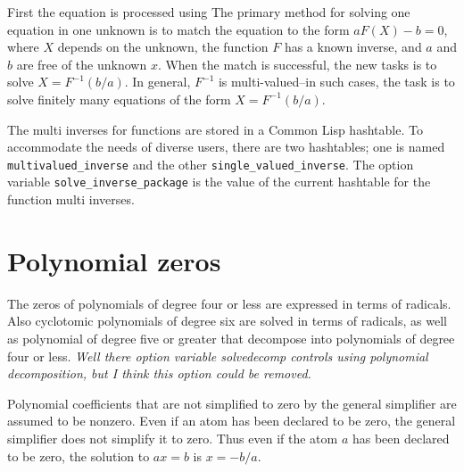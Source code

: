 \documentclass[]{article}%
\newcommand{\multivaluedinverse}{\texttt{multivalued\_inverse}}
\newcommand{\singlevaluedinverse}{\texttt{single\_valued\_inverse}}
\newcommand{\solveinversepackage}{\texttt{solve\_inverse\_package}}
\begin{document}
First the equation is processed using
The primary method for solving one equation in one unknown is to match the equation to the form \(a F(X) - b = 0\), where \(X\) depends on the unknown, the function \(F\) has a known inverse, and \(a\) and \(b\) are free of the unknown \(x\). When the match is successful, the new tasks is to solve \(X = F^{-1}(b/a) \). In general, \(F^{-1}\) is multi-valued--in such cases, the task is to solve finitely many equations of the form  \(X = F^{-1}(b/a) \).

The multi inverses for functions are stored in a Common Lisp hashtable. To accommodate the needs of diverse users,
there are two hashtables; one is named \multivaluedinverse\/ and the other \singlevaluedinverse.  The option
variable \solveinversepackage\/ is the value of the current hashtable for the function multi inverses.

\section{Polynomial zeros}

The zeros of polynomials of degree four or less are expressed in terms of radicals. Also  cyclotomic polynomials of degree six are solved in terms of radicals, as well as polynomial of degree five or greater that decompose into polynomials of degree four or less. \emph{Well there option variable solvedecomp controls using polynomial decomposition, but I think this option could be removed.}

\begin{alphalist}[noitemsep]

\item  Polynomial coefficients that are not simplified to zero by the  general simplifier are assumed to be nonzero. Even if an atom has been declared to be zero, the general simplifier does not simplify  it to zero. Thus even if the atom \(a\) has been declared to be zero, the solution to \(a x = b\) is \(x = -b/a \).



\end{alphalist}
\end{document}
